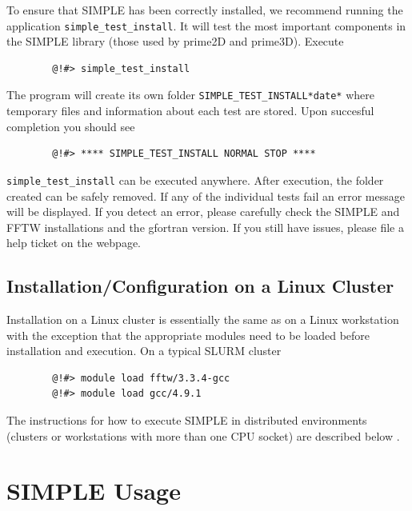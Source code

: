 \documentclass[a4paper,11pt]{article}
\begin{document}
\noindent{}To ensure that SIMPLE has been correctly installed, we recommend running the application \texttt{simple\_test\_install}. It will test the most 
important components in the SIMPLE library  (those used by prime2D and  prime3D). Execute

\begin{verbatim}
        @!#> simple_test_install 
\end{verbatim}

\noindent{}The program will create its own folder \texttt{SIMPLE\_TEST\_INSTALL*date*} where temporary files and information about each 
test are stored. Upon succesful completion you should see

\begin{verbatim}
        @!#> **** SIMPLE_TEST_INSTALL NORMAL STOP ****
\end{verbatim}

\noindent{}\texttt{simple\_test\_install} can be executed anywhere. After execution, the folder created can be safely removed. If any of the individual 
tests fail an error message will be displayed. If you detect an error, please carefully check the SIMPLE and FFTW installations 
and the gfortran version. If you still have issues, please file a help ticket on the webpage.

\subsection{Installation/Configuration on a Linux Cluster}

Installation on a Linux cluster is essentially the same as on a Linux workstation with the exception that the appropriate modules need to be loaded before installation and execution. On a typical SLURM cluster
\begin{verbatim}
        @!#> module load fftw/3.3.4-gcc
        @!#> module load gcc/4.9.1
\end{verbatim}
The instructions for how to execute SIMPLE in distributed environments (clusters or workstations with more than one CPU socket) are described below \label{distr}.

\section{SIMPLE Usage}
\end{document}
